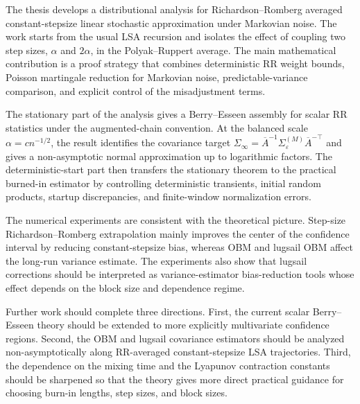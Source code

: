 The thesis develops a distributional analysis for Richardson--Romberg
averaged constant-stepsize linear stochastic approximation under Markovian
noise. The work starts from the usual LSA recursion and isolates the effect
of coupling two step sizes, $\alpha$ and $2\alpha$, in the Polyak--Ruppert
average. The main mathematical contribution is a proof strategy that combines
deterministic RR weight bounds, Poisson martingale reduction for Markovian
noise, predictable-variance comparison, and explicit control of the
misadjustment terms.

The stationary part of the analysis gives a Berry--Esseen assembly for scalar
RR statistics under the augmented-chain convention. At the balanced scale
$\alpha=c n^{-1/2}$, the result identifies the covariance target
$\Sigma_\infty=\overline A^{-1}\Sigma_{\varepsilon}^{(M)}\overline A^{-\top}$
and gives a non-asymptotic normal approximation up to logarithmic factors.
The deterministic-start part then transfers the stationary theorem to the
practical burned-in estimator by controlling deterministic transients,
initial random products, startup discrepancies, and finite-window
normalization errors.

The numerical experiments are consistent with the theoretical picture.
Step-size Richardson--Romberg extrapolation mainly improves the center of the
confidence interval by reducing constant-stepsize bias, whereas OBM and
lugsail OBM affect the long-run variance estimate. The experiments also show
that lugsail corrections should be interpreted as variance-estimator
bias-reduction tools whose effect depends on the block size and dependence
regime.

Further work should complete three directions. First, the current scalar
Berry--Esseen theory should be extended to more explicitly multivariate
confidence regions. Second, the OBM and lugsail covariance estimators should
be analyzed non-asymptotically along RR-averaged constant-stepsize LSA
trajectories. Third, the dependence on the mixing time and the Lyapunov
contraction constants should be sharpened so that the theory gives more
direct practical guidance for choosing burn-in lengths, step sizes, and block
sizes.

